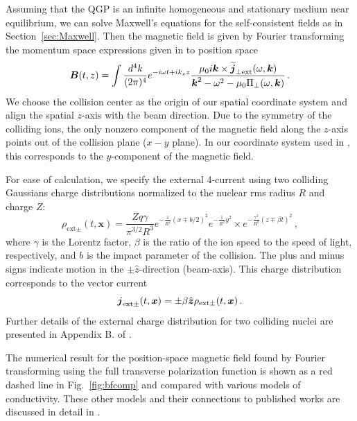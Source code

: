 \label{sec:Maxwell2}
Assuming that the QGP is an infinite homogeneous and stationary medium near equilibrium, we can solve Maxwell's equations for the self-consistent fields as in Section~\ref{sec:Maxwell}. Then the magnetic field is given by Fourier transforming the momentum space expressions given in  to position space
\begin{equation}\label{eq:magorgin}
   \boldsymbol{B}(t, z) = \int \frac{d^4k}{(2\pi)^4}  e^{-i\omega t+ik_z z}
 \frac{\mu_0 i \boldsymbol{k} \times\widetilde{\boldsymbol{j}}_{\perp \text{ext}}(\omega, \boldsymbol{k})}{\boldsymbol{k}^2 - \omega^2 - \mu_0 \Pi_{\perp}(\omega, \boldsymbol{k})}\,.
\end{equation}
We choose the collision center as the origin of our spatial coordinate system and align the spatial $z$-axis with the beam direction. Due to the symmetry of the colliding ions, the only nonzero component of the magnetic field along the $z$-axis points out of the collision plane ($x-y$ plane). In our coordinate system used in \cite{Grayson:2022asf}, this corresponds to the $y$-component of the magnetic field. 

For ease of calculation, we specify the external 4-current using two colliding Gaussians charge distributions normalized to the nuclear rms radius $R$ and charge $Z$:
\begin{equation}\label{eq:rhoext}
\rho_{\text{ext}\pm }(t,\boldsymbol{x}) = \frac{Zq\gamma}{\pi^{3/2}R^3}e^{-\frac{1}{R^2}(x\mp b/2)^2}e^{-\frac{1}{R^2}y^2}
\times e^{-\frac{\gamma^2}{R^2}(z\mp \beta t)^2}\,,
\end{equation}
where $\gamma$ is the Lorentz factor, $\beta$ is the ratio of the ion speed to the speed of light, respectively, and $b$ is the impact parameter of the collision. The plus and minus signs indicate motion in the $\pm \hat{z}$-direction (beam-axis). This charge distribution corresponds to the vector current
\begin{equation}\label{eq:jext}
\boldsymbol{j}_{\text{ext}\pm}(t, \boldsymbol{x}) = \pm \beta \hat{\boldsymbol{z}} \rho_{\text{ext}\pm}(t, \boldsymbol{x})\,.
\end{equation}
Further details of the external charge distribution for two colliding nuclei are presented in Appendix B. of \cite{Grayson:2022asf}.

The numerical result for the position-space magnetic field found by Fourier transforming  using the full transverse polarization function  is shown as a red dashed line in Fig.~\ref{fig:bfcomp} and compared with various models of conductivity. These other models and their connections to published works are discussed in detail in \cite{Grayson:2022asf}.

